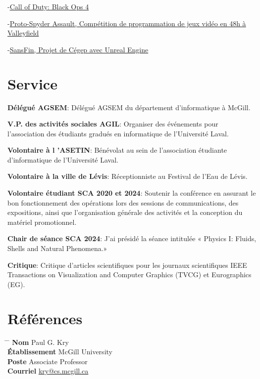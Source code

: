 \documentclass[10pt]{article} %
\begin{document}
{
-\href{https://www.callofduty.com/ca/en/blackops4}{Call of Duty: Black Ops 4}

-\href{https://youtu.be/qJjy8b0kuSY}{Proto-Spyder Assault, Compétition de programmation de jeux vidéo en 48h à Valleyfield}

-\href{https://youtu.be/s6vr07Nt1IY}{SansFin, Projet de Cégep avec Unreal Engine}
}

\section{Service}
\textbf{Délégué AGSEM}: Délégué AGSEM du département d'informatique à McGill.

\noindent\textbf{V.P. des activités sociales AGIL}: Organiser des événements pour l'association des étudiants gradués en informatique de l'Université Laval.

\noindent\textbf{Volontaire à l 'ASETIN}: Bénévolat au sein de l'association étudiante d'informatique de l'Université Laval.

\noindent\textbf{Volontaire à la ville de Lévis}: Réceptionniste au Festival de l'Eau de Lévis.

\noindent\textbf{Volontaire étudiant SCA 2020 et 2024}: Soutenir la conférence en assurant le bon fonctionnement des opérations lors des
sessions de communications, des expositions, ainsi que l'organisation générale des activités et la conception du matériel promotionnel.

\noindent\textbf{Chair de séance SCA 2024}: J'ai présidé la séance intitulée « Physics I: Fluids, Shells and Natural Phenomena.»

\noindent\textbf{Critique}: Critique d'articles scientifiques pour les journaux scientifiques IEEE Transactions on Visualization and Computer Graphics (TVCG) et Eurographics (EG).


\section{Références}

\parbox{0.5\textwidth}{
\begin{tabbing}
\hspace{2.75cm} \= \hspace{4cm} \= \kill
{\bf Nom} \> Paul G. Kry\\ 
{\bf Établissement} \> McGill University\\ 
{\bf Poste} \> Associate Professor \\ 
{\bf Courriel} \> \href{mailto:kry@cs.mcgill.ca}{kry@cs.mcgill.ca}
\end{tabbing}}
\end{document}
